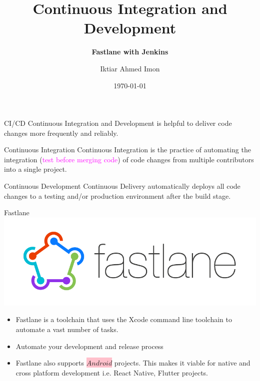 \documentclass{beamer}
\title{Continuous Integration and Development}
\subtitle{\textbf{Fastlane with Jenkins}}
\author{Iktiar Ahmed Imon}
\institute{\large \textbf{\color{red}{Kona Software Lab Ltd.}}}
\date{\today}
\begin{document}

\begin{frame}
    \titlepage
\end{frame}

\begin{frame}[t]{CI/CD} 
    \vspace{3pt}
    Continuous Integration and Development is helpful to deliver code changes more frequently and reliably.
    \vspace{3pt}

    \begin{block}{Continuous Integration}
        \vspace{0.5em}
            Continuous Integration is the practice of automating the integration (\textcolor{magenta}{test before merging code}) of code changes from multiple contributors into a single project.
    \vspace{0.5em}
    \end{block}

    \vspace{3pt}

    \begin{block}{Continuous Development}
        \vspace{0.5em}
            Continuous Delivery automatically deploys all code changes to a testing and/or production environment after the build stage.
        \vspace{0.5em}
    \end{block}

\end{frame}

\begin{frame}[t]{Fastlane}
    \includegraphics[scale=0.25]{fastlane}\centering
    \vspace{3pt}
    \begin{itemize}
        \item Fastlane is a toolchain that uses the Xcode command line toolchain to automate a vast number of tasks.
       \item Automate your development and release process
       \item Fastlane also supports \colorbox{pink}{$Android$} projects. This makes it viable for native and cross platform development i.e. React Native, Flutter projects.
    \end{itemize}
\end{frame}
\end{document}
